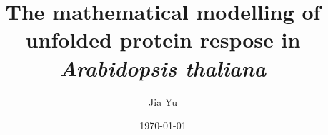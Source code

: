 \documentclass[a4paper,12pt]{book}
\begin{document}
\graphicspath{{C:/Users/giaccoyu/Desktop/TeXWorks/Fig/Presentations/}}

\author{Jia Yu}
\title{The mathematical modelling of unfolded protein respose in \textit{Arabidopsis thaliana} }
\date{\today}

\frontmatter
\maketitle
\linespread{0.8}
\listoffigures
\listoftables
\tableofcontents


\mainmatter
\linespread{1.2}












\backmatter
\appendix
\begin{appendices}
	
	
\end{appendices}


\end{document}

